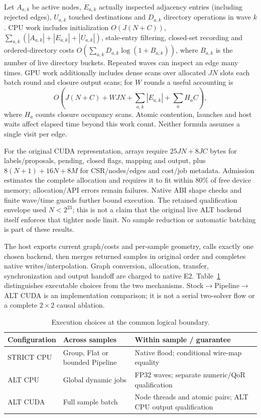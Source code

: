 Let $A_{a,k}$ be active nodes, $E_{a,k}$ actually inspected adjacency entries (including rejected edges), $U_{a,k}$ touched destinations and $D_{a,k}$ directory operations in wave $k$. CPU work includes initialization $O(J(N+C))$, $\sum_{a,k}(|A_{a,k}|+|E_{a,k}|+|U_{a,k}|)$, stale-entry filtering, closed-set recording and ordered-directory costs $O(\sum_{a,k}D_{a,k}\log(1+B_{a,k}))$, where $B_{a,k}$ is the number of live directory buckets. Repeated waves can inspect an edge many times. GPU work additionally includes dense scans over allocated $JN$ slots each batch round and closure output scans; for $W$ rounds a useful accounting is
\begin{equation}
 O\!\left(J(N+C)+WJN+\sum_{a,k}|E_{a,k}|+\sum_a H_a C\right),
\end{equation}
where $H_a$ counts closure occupancy scans. Atomic contention, launches and host waits affect elapsed time beyond this work count. Neither formula assumes a single visit per edge.

For the original CUDA representation, arrays require $25JN+8JC$ bytes for labels/proposals, pending, closed flags, mapping and output, plus $8(N+1)+16N+8M$ for CSR/nodes/edges and cost/job metadata. Admission estimates the complete allocation and requires it to fit within 80\% of free device memory; allocation/API errors remain failures. Native ABI shape checks and finite wave/time guards further bound execution. The retained qualification envelope used $N<2^{23}$; this is not a claim that the original live ALT backend itself enforces that tighter node limit. No sample reduction or automatic batching is part of these results.

The host exports current graph/costs and per-sample geometry, calls exactly one chosen backend, then merges returned samples in original order and completes native writes/interpolation. Graph conversion, allocation, transfer, synchronization and output handoff are charged to native E2. Table~\ref{tab:configs} distinguishes executable choices from the two mechanisms. Stock$\to$Pipeline$\to$ALT CUDA is an implementation comparison; it is not a serial two-solver flow or a complete $2\times2$ causal ablation.

\begin{table}[t]\centering
\caption{Execution choices at the common logical boundary.}\label{tab:configs}
\begin{tabular}{lp{2.35cm}p{3.60cm}}\toprule
Configuration & Across samples & Within sample / guarantee\\\midrule
STRICT CPU & Group, Flat or bounded Pipeline & Native flood; conditional wire-map equality\\
ALT CPU & Global dynamic jobs & FP32 waves; separate numeric/QoR qualification\\
ALT CUDA & Full sample batch & Node threads and atomic pairs; ALT CPU output qualification\\\bottomrule
\end{tabular}\end{table}
